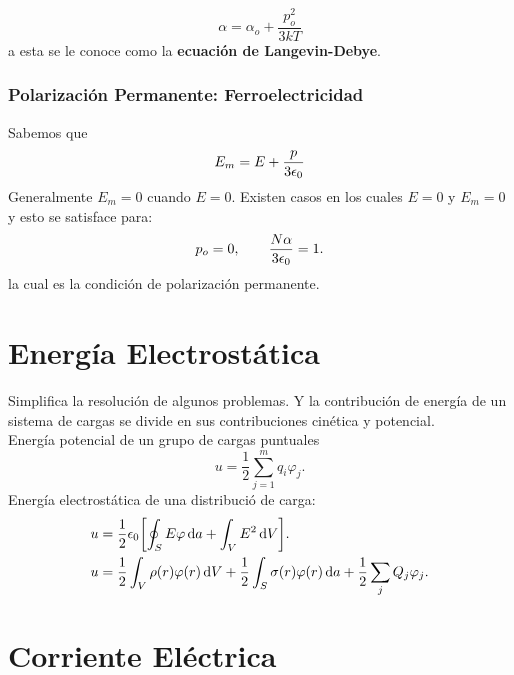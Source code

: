 \begin{equation}
	\alpha = \alpha _o + \frac{p_o ^2}{3kT}
\end{equation}
a esta se le conoce como la \textbf{ecuación de Langevin-Debye}.

\subsection{Polarización Permanente: Ferroelectricidad}
Sabemos que
\begin{equation}
	E_m = E + \frac{p}{3\epsilon_0}
\end{equation}
Generalmente $E_m = 0$ cuando $E = 0$. Existen casos en los cuales $E = 0$ y $E_m = 0$ y esto se satisface para:
\begin{equation}
	p_o = 0, \qquad \frac{N \alpha}{3\epsilon_0} = 1.
\end{equation}
la cual es la condición de polarización permanente.






\chapter{Energía Electrostática}
Simplifica la resolución de algunos problemas. Y la contribución de energía de un sistema de cargas se divide en sus contribuciones cinética y potencial. \\
Energía potencial de un grupo de cargas puntuales
\begin{equation}
	u = \frac{1}{2} \sum _{j=1} ^{m} q_i \varphi _j.
\end{equation}
Energía electrostática de una distribució de carga:
\begin{align*}
	u &= \frac{1}{2} \epsilon_0 \qty[\oint _S E\varphi \dd{a} + \int _V E^2 \dd{V}]. \\
	u &= \frac{1}{2} \int _V \rho (r) \varphi (r) \dd{V} + \frac{1}{2} \int _S \sigma (r) \varphi (r) \dd{a} + \frac{1}{2} \sum _j Q_j \varphi _j.
\end{align*}

















\chapter{Corriente Eléctrica}








